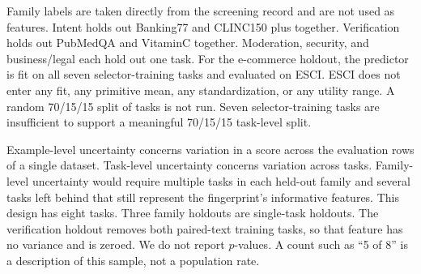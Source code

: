 Family labels are taken directly from the screening record and are not used as features. Intent holds out Banking77 and CLINC150 plus together. Verification holds out PubMedQA and VitaminC together. Moderation, security, and business/legal each hold out one task. For the e-commerce holdout, the predictor is fit on all seven selector-training tasks and evaluated on ESCI. ESCI does not enter any fit, any primitive mean, any standardization, or any utility range. A random 70/15/15 split of tasks is not run. Seven selector-training tasks are insufficient to support a meaningful 70/15/15 task-level split.

Example-level uncertainty concerns variation in a score across the evaluation rows of a single dataset. Task-level uncertainty concerns variation across tasks. Family-level uncertainty would require multiple tasks in each held-out family and several tasks left behind that still represent the fingerprint's informative features. This design has eight tasks. Three family holdouts are single-task holdouts. The verification holdout removes both paired-text training tasks, so that feature has no variance and is zeroed. We do not report \(p\)-values. A count such as ``5 of 8'' is a description of this sample, not a population rate.
